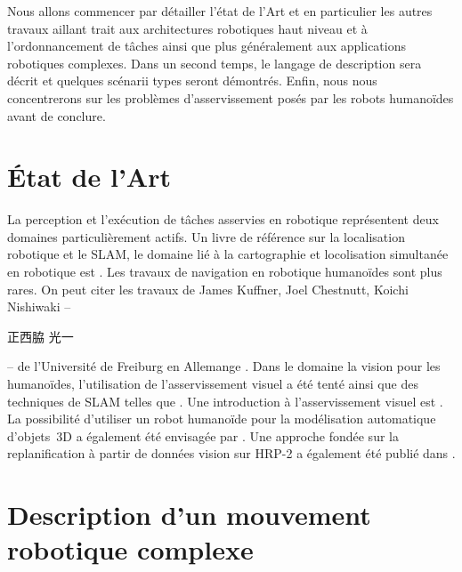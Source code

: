Nous allons commencer par détailler l'état de l'Art et en particulier
les autres travaux aillant trait aux architectures robotiques haut
niveau et à l'ordonnancement de tâches ainsi que plus généralement aux
applications robotiques complexes. Dans un second temps, le langage de
description sera décrit et quelques scénarii types seront
démontrés. Enfin, nous nous concentrerons sur les problèmes
d'asservissement posés par les robots humanoïdes avant de conclure.


\section{État de l'Art}


La perception et l'exécution de tâches asservies en robotique
représentent deux domaines particulièrement actifs. Un livre de
référence sur la localisation robotique et le SLAM, le domaine lié à la cartographie
et locolisation simultanée en robotique est \cite{05thrun}. Les
travaux de navigation en robotique humanoïdes sont plus rares. On peut
citer les travaux de James Kuffner, Joel Chestnutt, Koichi Nishiwaki
-- \begin{CJK*}{UTF8}{min}正西脇 光一\end{CJK*} --
  \cite{05michel.humanoids,05ozawa.smc,03chestnutt.humanoids,02nishiwaki.rsj}
  de l'Université de Freiburg en Allemange \cite{10osswald.icra}. Dans
  le domaine la vision pour les humanoïdes, l'utilisation de
  l'asservissement visuel a été tenté \cite{10dune.iros} ainsi que des
  techniques de SLAM telles que
  \cite{06stasse.iros,09kwak.humanoids}. Une introduction à
  l'asservissement visuel est
  \cite{06chaumette.ram,07chaumette.ram}. La possibilité d'utiliser un
  robot humanoïde pour la modélisation automatique d'objets 3D a
  également été envisagée par \cite{09foisotte.icra,08stasse.ras}. Une
  approche fondée sur la replanification à partir de données vision
  sur HRP-2 a également été publié dans
  \cite{11dang.humanoids}.


\section{Description d'un mouvement robotique complexe}



